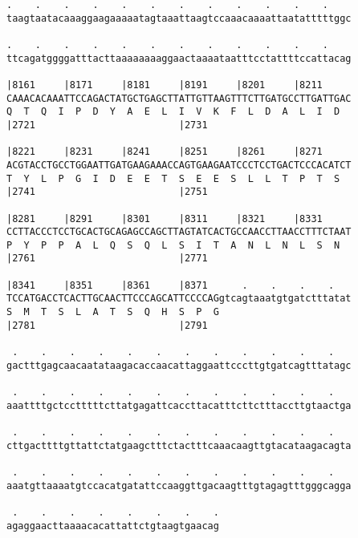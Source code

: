 \documentclass{article}
\begin{document}
\begin{Verbatim}
.    .    .    .    .    .    .    .    .    .    .    .    
taagtaatacaaaggaagaaaaatagtaaattaagtccaaacaaaattaatatttttggc
                                                            
.    .    .    .    .    .    .    .    .    .    .    .    
ttcagatggggatttacttaaaaaaaaggaactaaaataatttcctattttccattacag
                                                            
|8161     |8171     |8181     |8191     |8201     |8211     
CAAACACAAATTCCAGACTATGCTGAGCTTATTGTTAAGTTTCTTGATGCCTTGATTGAC
Q  T  Q  I  P  D  Y  A  E  L  I  V  K  F  L  D  A  L  I  D  
|2721                         |2731                         
  
|8221     |8231     |8241     |8251     |8261     |8271     
ACGTACCTGCCTGGAATTGATGAAGAAACCAGTGAAGAATCCCTCCTGACTCCCACATCT
T  Y  L  P  G  I  D  E  E  T  S  E  E  S  L  L  T  P  T  S  
|2741                         |2751                         
  
|8281     |8291     |8301     |8311     |8321     |8331     
CCTTACCCTCCTGCACTGCAGAGCCAGCTTAGTATCACTGCCAACCTTAACCTTTCTAAT
P  Y  P  P  A  L  Q  S  Q  L  S  I  T  A  N  L  N  L  S  N  
|2761                         |2771                         
  
|8341     |8351     |8361     |8371      .    .    .    .   
TCCATGACCTCACTTGCAACTTCCCAGCATTCCCCAGgtcagtaaatgtgatctttatat
S  M  T  S  L  A  T  S  Q  H  S  P  G                       
|2781                         |2791                         
  
 .    .    .    .    .    .    .    .    .    .    .    .   
gactttgagcaacaatataagacaccaacattaggaattcccttgtgatcagtttatagc
                                                            
 .    .    .    .    .    .    .    .    .    .    .    .   
aaattttgctcctttttcttatgagattcaccttacatttcttctttaccttgtaactga
                                                            
 .    .    .    .    .    .    .    .    .    .    .    .   
cttgacttttgttattctatgaagctttctactttcaaacaagttgtacataagacagta
                                                            
 .    .    .    .    .    .    .    .    .    .    .    .   
aaatgttaaaatgtccacatgatattccaaggttgacaagtttgtagagtttgggcagga
                                                            
 .    .    .    .    .    .    .    .
agaggaacttaaaacacattattctgtaagtgaacag
                                     

\end{Verbatim}
\end{document}
